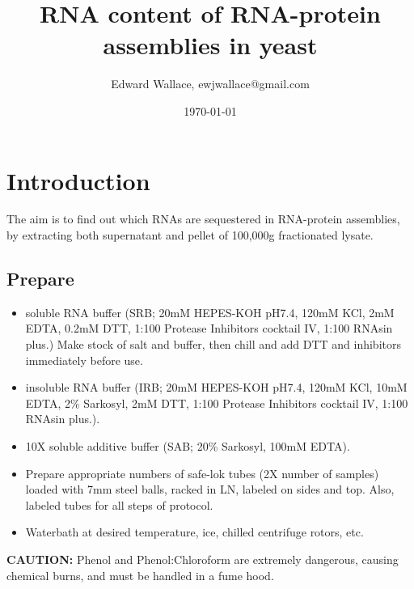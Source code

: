 \documentclass{article}
\begin{document}
\title{RNA content of RNA-protein assemblies in yeast}
\author{Edward Wallace, ewjwallace@gmail.com}
\date{\today}
\maketitle


\section*{Introduction}

The aim is to find out which RNAs are sequestered in RNA-protein assemblies, by extracting both supernatant and pellet of 100,000g fractionated lysate. %

\subsection*{Prepare}

\begin{itemize}
  \item soluble RNA buffer (SRB; 20mM HEPES-KOH pH7.4, 120mM KCl, 2mM EDTA, 0.2mM DTT, 1:100 Protease Inhibitors cocktail IV, 1:100 RNAsin plus.) Make stock of salt and buffer, then chill and add DTT and inhibitors immediately before use.
  \item insoluble RNA buffer (IRB; 20mM HEPES-KOH pH7.4, 120mM KCl, 10mM EDTA, 2\% Sarkosyl, 2mM DTT, 1:100 Protease Inhibitors cocktail IV, 1:100 RNAsin plus.). 
  \item 10X soluble additive buffer (SAB; 20\% Sarkosyl, 100mM EDTA). %
  \item Prepare appropriate numbers of safe-lok tubes (2X number of samples) loaded with 7mm steel balls, racked in LN, labeled on sides and top. Also, labeled tubes for all steps of protocol.
  \item Waterbath at desired temperature, ice, chilled centrifuge rotors, etc.
\end{itemize}

\textbf{CAUTION:} Phenol and Phenol:Chloroform are extremely dangerous, causing chemical burns, and must be handled in a fume hood.
\end{document}
